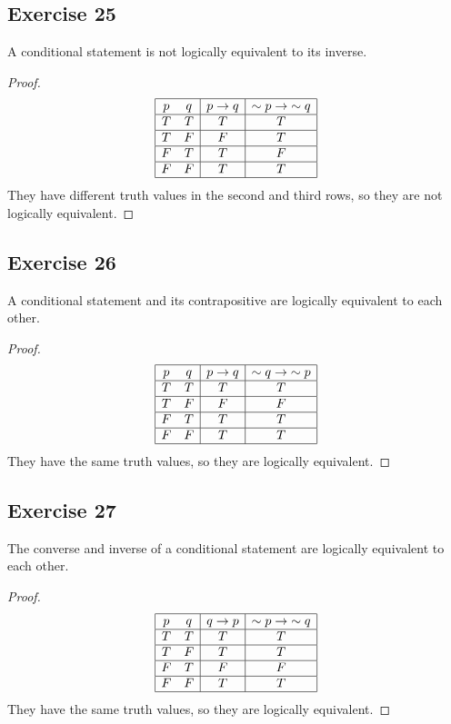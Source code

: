 \documentclass[14pt]{extarticle}
\begin{document}
\subsection{Exercise 25} A conditional statement is not logically equivalent to its inverse.

\begin{proof} 
$$ 
\begin{array}{|cc|c|c|} 
\hline 
p & q & p \to q & {\sim p} \to {\sim q} \\ 
\hline 
T & T & T & T \\ 
\hline 
T & F & F & T \\ 
\hline 
F & T & T & F \\ 
\hline 
F & F & T & T \\ 
\hline 
\end{array} 
$$ 
They have different truth values in the second and third rows, so they are not logically equivalent.
\end{proof}

\subsection{Exercise 26} 
A conditional statement and its contrapositive are logically equivalent to each other.

\begin{proof} 
$$ 
\begin{array}{|cc|c|c|} 
\hline 
p & q & p \to q & {\sim q} \to{\sim p} \\ 
\hline 
T & T & T & T \\ 
\hline 
T & F & F & F \\ 
\hline 
F & T & T & T \\ 
\hline 
F & F & T & T \\ 
\hline 
\end{array} 
$$ 
They have the same truth values, so they are logically equivalent. 
\end{proof}

\subsection{Exercise 27} 
The converse and inverse of a conditional statement are logically equivalent to each other.

\begin{proof} 
$$ 
\begin{array}{|cc|c|c|} 
\hline 
p & q & q \to p & {\sim p} \to {\sim q} \\ 
\hline 
T & T & T & T \\ 
\hline 
T & F & T & T \\ 
\hline 
F & T & F & F \\ 
\hline 
F & F & T & T \\ 
\hline 
\end{array} 
$$ 
They have the same truth values, so they are logically equivalent. 
\end{proof}
\end{document}
